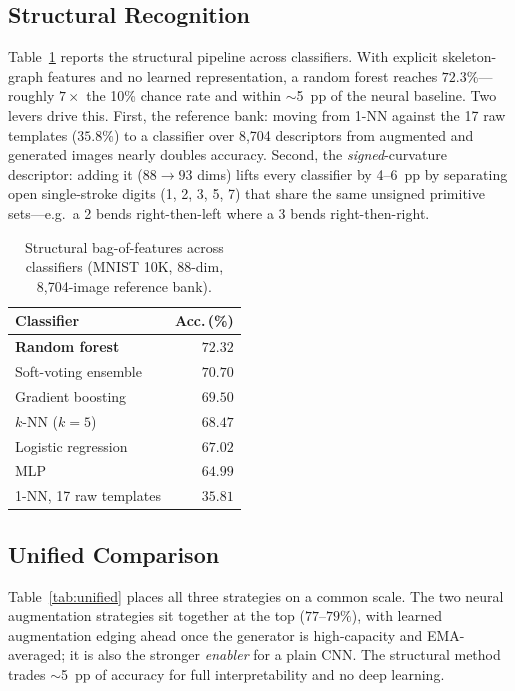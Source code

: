 \documentclass[final,5p,times,twocolumn]{elsarticle}
\begin{document}
\subsection{Structural Recognition}
\label{sec:structural-results}

Table~\ref{tab:structural} reports the structural pipeline across classifiers.
With explicit skeleton-graph features and no learned representation, a random forest reaches
$72.3\%$—roughly $7\times$ the 10\% chance rate and within $\sim$5~pp of the neural
baseline.
Two levers drive this. First, the reference bank: moving from 1-NN against the 17 raw
templates ($35.8\%$) to a classifier over 8{,}704 descriptors from augmented and generated
images nearly doubles accuracy.
Second, the \emph{signed}-curvature descriptor: adding it ($88\to93$ dims) lifts every
classifier by 4--6~pp by separating open single-stroke digits (1, 2, 3, 5, 7) that share the
same unsigned primitive sets—e.g.\ a 2 bends right-then-left where a 3 bends right-then-right.

\begin{table}[t]
  \caption{Structural bag-of-features across classifiers (MNIST 10K, 88-dim, 8{,}704-image
           reference bank).}
  \label{tab:structural}
  \centering
  \begin{tabular}{@{}lr@{}}
    \toprule
    Classifier & Acc.\,(\%) \\
    \midrule
    \textbf{Random forest}     & $\mathbf{72.32}$ \\
    Soft-voting ensemble       & $70.70$ \\
    Gradient boosting          & $69.50$ \\
    $k$-NN ($k{=}5$)           & $68.47$ \\
    Logistic regression        & $67.02$ \\
    MLP                        & $64.99$ \\
    \midrule
    1-NN, 17 raw templates     & $35.81$ \\
    \bottomrule
  \end{tabular}
\end{table}

\subsection{Unified Comparison}
\label{sec:unified}

Table~\ref{tab:unified} places all three strategies on a common scale.
The two neural augmentation strategies sit together at the top ($77$--$79\%$), with learned
augmentation edging ahead once the generator is high-capacity and EMA-averaged; it is also
the stronger \emph{enabler} for a plain CNN. The structural method trades $\sim$5~pp of
accuracy for full interpretability and no deep learning.
\end{document}
